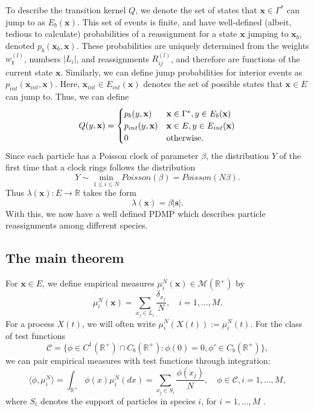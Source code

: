 To describe the transition kernel $Q$, we denote the set of states that  $\textbf{x} \in \Gamma^*$ can jump to as $E_b(\textbf{x})$.  This set of events is finite, and have well-defined (albeit, tedious to calculate) probabilities of a reassignment for a state $\textbf{x}$ jumping to $\textbf{x}_b$, denoted $p_{b}(\textbf{x}_b, \textbf{x})$.  These probabilities are uniquely determined from the weights $w^{(l)}_k$, numbers $|L_i|$, and reassignments $R_{ij}^{(l)}$, and therefore are functions of the current state $\textbf{x}$.   Similarly, we can define jump probabilities for interior events as $p_{int}(\textbf{x}_{int},\textbf{x}) $. Here, $\textbf{x}_{int} \in E_{int}(\textbf{x})$ denotes the set of possible states that $\textbf{x}\in E$ can jump to.  Thus, we can define
\begin{equation}
Q(y,\textbf{x}) = \begin{cases}p_{b}(y,\textbf{x}) & \textbf{x} \in \Gamma^*, y\in E_b(\textbf{x}) \\
p_{int}(y,\textbf{x}) & \textbf{x} \in E, y \in E_{int}(\textbf{x})   \\
0 & \hbox{otherwise}. 
\end{cases}
\end{equation}
Since each particle has a Poisson clock of parameter $\beta$, the distribution $Y$ of the first time that a clock rings follows the distribution 
\begin{equation}
Y \sim \min_{1\le i\le N} Poisson(\beta) = Poisson(N\beta).
\end{equation}
Thus $\lambda(\textbf{x}): E \rightarrow \mathbb{R}$ takes the form
\begin{equation}
\lambda(\textbf{x}) = \beta |\mathbf s|.
\end{equation}
With this, we now have a well defined PDMP which describes particle reassignments among different species.

\subsection{The main theorem}


For $\textbf{x} \in E$, we define empirical measures $\mu^N_i(\textbf{x}) \in \mathcal M(\mathbb{R}^+)$ by
\begin{equation}
\mu_i^N(\textbf{x}) = \sum_{x_j \in L_i} \frac{\delta_{x_j}}{N}, \quad i = 1,\dots, M.
\end{equation}
For a process $X(t)$, we will often write $\mu_i^N(X(t)):=\mu_i^N(t)$.
For the class of test functions
\begin{equation}
\mathcal C = \{\phi\in C^1(\mathbb{R}^+)\cap C_b(\mathbb{R}^+) : \phi(0) = 0, \phi' \in C_b(\mathbb{R}^+)\},
\end{equation} 
we can pair empirical measures with test functions through integration:
\begin{equation}
\langle \phi, \mu_i^N \rangle = \int_{\mathbb{R}^+} \phi(x)\mu_i^N(dx) = \sum_{x_j \in S_i} \frac{\phi(x_j)}{N}, \quad \phi \in \mathcal C, i = 1, \dots, M,
\end{equation}
where $S_i$ denotes the support of particles in species $i$, for $i = 1,\dots, M$ .

